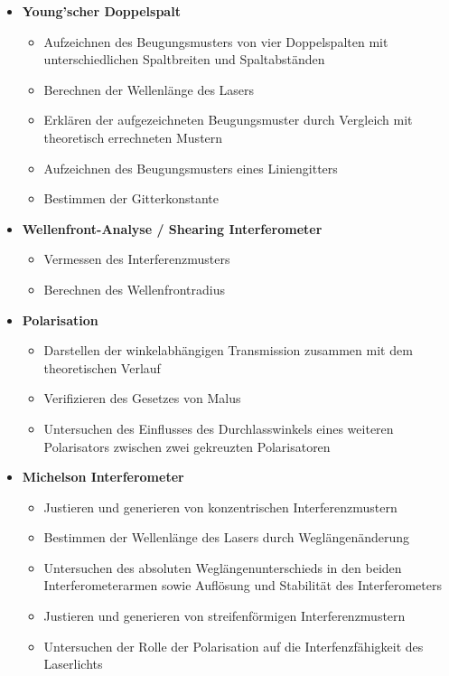 \documentclass[ngerman]{scrartcl}
\begin{document}
\begin{itemize}
    \item \textbf{Young'scher Doppelspalt}
          \begin{itemize}
              \item Aufzeichnen des Beugungsmusters von vier Doppelspalten mit unterschiedlichen Spaltbreiten und Spaltabständen %
              \item Berechnen der Wellenlänge des Lasers %
              \item Erklären der aufgezeichneten Beugungsmuster durch Vergleich mit theoretisch errechneten Mustern %
              \item Aufzeichnen des Beugungsmusters eines Liniengitters %
              \item Bestimmen der Gitterkonstante %
          \end{itemize}
    \item \textbf{Wellenfront-Analyse / Shearing Interferometer}
          \begin{itemize}
              \item Vermessen des Interferenzmusters %
              \item Berechnen des Wellenfrontradius %
          \end{itemize}
    \item \textbf{Polarisation}
          \begin{itemize}
              \item Darstellen der winkelabhängigen Transmission zusammen mit dem theoretischen Verlauf %
              \item Verifizieren des Gesetzes von Malus %
              \item Untersuchen des Einflusses des Durchlasswinkels eines weiteren Polarisators zwischen zwei gekreuzten Polarisatoren %
          \end{itemize}
    \item \textbf{Michelson Interferometer}
          \begin{itemize}
              \item Justieren und generieren von konzentrischen Interferenzmustern %
              \item Bestimmen der Wellenlänge des Lasers durch Weglängenänderung %
              \item Untersuchen des absoluten Weglängenunterschieds in den beiden Interferometerarmen sowie Auflösung und Stabilität des Interferometers %
              \item Justieren und generieren von streifenförmigen Interferenzmustern %
              \item Untersuchen der Rolle der Polarisation auf die Interfenzfähigkeit des Laserlichts %
          \end{itemize}
\end{itemize}
\end{document}
